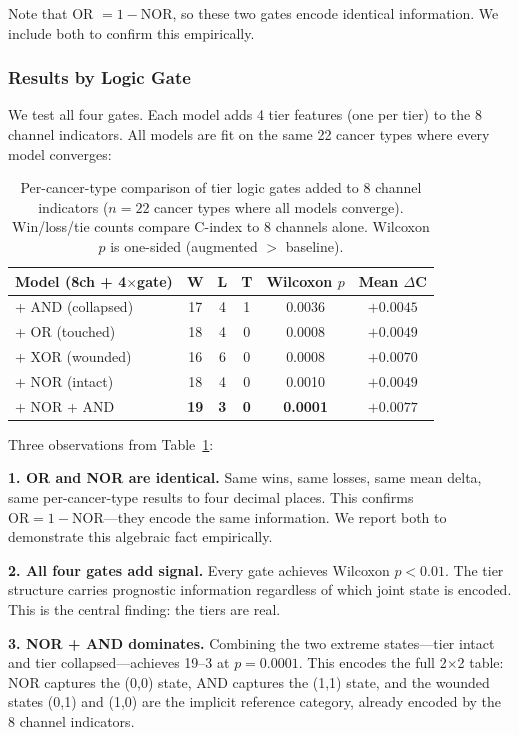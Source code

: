 \documentclass[11pt]{article}
\begin{document}
Note that OR $= 1 - \text{NOR}$, so these two gates encode
identical information. We include both to confirm this
empirically.

\subsubsection{Results by Logic Gate}

We test all four gates. Each model adds 4 tier features (one per
tier) to the 8 channel indicators. All models are fit on the same
22 cancer types where every model converges:

\begin{table}[ht]
\centering
\caption{Per-cancer-type comparison of tier logic gates added to
8 channel indicators ($n = 22$ cancer types where all models
converge). Win/loss/tie counts compare C-index to 8 channels
alone. Wilcoxon $p$ is one-sided (augmented $>$ baseline).}
\label{tab:gates}
\begin{tabular}{@{}lccccc@{}}
\toprule
Model (8ch + 4$\times$gate) & W & L & T & Wilcoxon $p$ & Mean $\Delta$C \\
\midrule
+ AND (collapsed) & 17 & 4 & 1 & 0.0036 & $+0.0045$ \\
+ OR (touched) & 18 & 4 & 0 & 0.0008 & $+0.0049$ \\
+ XOR (wounded) & 16 & 6 & 0 & 0.0008 & $+0.0070$ \\
+ NOR (intact) & 18 & 4 & 0 & 0.0010 & $+0.0049$ \\
\midrule
+ NOR + AND & \textbf{19} & \textbf{3} & \textbf{0} & \textbf{0.0001} & $\mathbf{+0.0077}$ \\
\bottomrule
\end{tabular}
\end{table}

Three observations from Table~\ref{tab:gates}:

\textbf{1. OR and NOR are identical.} Same wins, same losses,
same mean delta, same per-cancer-type results to four decimal
places. This confirms $\text{OR} = 1 - \text{NOR}$---they encode
the same information. We report both to demonstrate this
algebraic fact empirically.

\textbf{2. All four gates add signal.} Every gate achieves
Wilcoxon $p < 0.01$. The tier structure carries prognostic
information regardless of which joint state is encoded. This is
the central finding: the tiers are real.

\textbf{3. NOR + AND dominates.} Combining the two extreme
states---tier intact and tier collapsed---achieves 19--3 at
$p = 0.0001$. This encodes the full 2$\times$2 table: NOR
captures the (0,0) state, AND captures the (1,1) state, and
the wounded states (0,1) and (1,0) are the implicit reference
category, already encoded by the 8 channel indicators.
\end{document}
